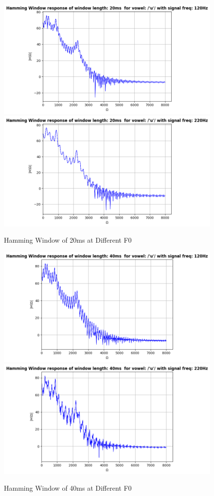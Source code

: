 \documentclass{article}
\begin{document}
\begin{figure}[H]
\centering
\includegraphics[scale = 0.5]{ham_20_120.png}\hfill
\includegraphics[scale = 0.5]{ham_20_220.png}
\caption{Hamming Window of 20ms at Different F0}
\end{figure}

\begin{figure}[H]
\centering
\includegraphics[scale = 0.5]{ham_40_120.png}\hfill
\includegraphics[scale = 0.5]{ham_40_220.png}
\caption{Hamming Window of 40ms at Different F0}
\end{figure}
\newpage
\end{document}
